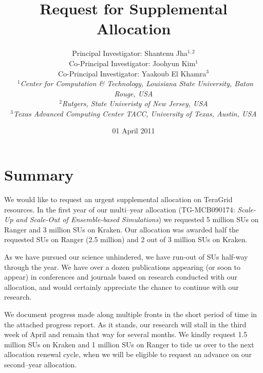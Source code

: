 \documentclass[a4paper,10pt]{article}
\begin{document}
\title{\Large Request for Supplemental Allocation}

\author{Principal Investigator: Shantenu Jha$^{1,2}$ \\ Co-Principal Investigator: Joohyun Kim$^{1}$ \\ Co-Principal Investigator: Yaakoub El Khamra$^{3}$\\\
   \small{\emph{$^{1}$Center for Computation \& Technology, Louisiana State University, Baton Rouge,
USA}}
\\
  \small{\emph{$^{2}$Rutgers, State Univeristy of New Jersey, USA}}
\\
  \small{\emph{$^{3}$Texas Advanced Computing Center TACC, University of Texas, Austin, USA}}}

\newif\ifdraft
\drafttrue
\ifdraft
\newcommand{\amnote}[1]{ {\textcolor{magenta} { ***AM: #1c }}}
\newcommand{\jhanote}[1]{ {\textcolor{red} { ***SJ: #1 }}}
\newcommand{\yyenote}[1]{ {\textcolor{blue} { ***YYE: #1 }}}
\newcommand{\michaelnote}[1]{ {\textcolor{blue} { ***MM: #1 }}}
\else
\newcommand{\amnote}[1]{}
\newcommand{\jhanote}[1]{}
\newcommand{\yyenote}[1]{}
\newcommand{\michaelnote}[1]{ {\textcolor{blue} { ***MM: #1 }}}
\fi


\date{01 April 2011}

\maketitle

\section{Summary}

We would  like to request an urgent supplemental allocation on TeraGrid resources. In the first year of our multi--year allocation (TG-MCB090174: {\it Scale-Up and Scale-Out of Ensemble-based Simulations}) we requested 5 million SUs on Ranger and 3 million SUs on Kraken. Our allocation was awarded half the requested SUs on Ranger (2.5 million) and 2 out of 3 million SUs on Kraken.

As we have pursued our science unhindered, we have run-out of SUs half-way through the year. We have over a dozen publications appearing (or soon to appear) in conferences and journals based on research conducted with our allocation, and would certainly appreciate the chance to continue with our research.

We document progress made along multiple fronts in the short period of time in the attached progress report.  As it stands, our research will stall in the third week of April and remain that way for several months. We kindly request 1.5 million SUs on Kraken and 1 million SUs on Ranger to tide us over to the next allocation renewal cycle, when we will be eligible to request an advance on our second--year allocation. 
\end{document}
